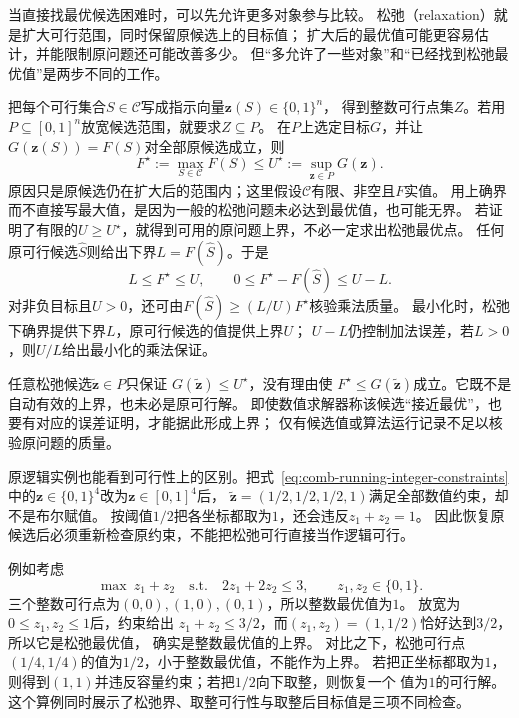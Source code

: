 当直接找最优候选困难时，可以先允许更多对象参与比较。
松弛（relaxation）就是扩大可行范围，同时保留原候选上的目标值；
扩大后的最优值可能更容易估计，并能限制原问题还可能改善多少。
但“多允许了一些对象”和“已经找到松弛最优值”是两步不同的工作。

把每个可行集合$S\in\mathcal C$写成指示向量$\bm z(S)\in\{0,1\}^n$，
得到整数可行点集$Z$。若用$P\subseteq[0,1]^n$放宽候选范围，就要求$Z\subseteq P$。
在$P$上选定目标$G$，并让$G(\bm z(S))=F(S)$对全部原候选成立，则
\begin{equation}
  F^\star:=\max_{S\in\mathcal C}F(S)
  \leq U^\star:=\sup_{\bm z\in P}G(\bm z).
  \label{eq:comb-relaxation-upper-bound}
\end{equation}
原因只是原候选仍在扩大后的范围内；这里假设$\mathcal C$有限、非空且$F$实值。
用上确界而不直接写最大值，是因为一般的松弛问题未必达到最优值，也可能无界。
若证明了有限的$U\geq U^\star$，就得到可用的原问题上界，不必一定求出松弛最优点。
任何原可行候选$\widehat S$则给出下界$L=F(\widehat S)$。于是
\begin{equation}
  L\leq F^\star\leq U,\qquad
  0\leq F^\star-F(\widehat S)\leq U-L.
  \label{eq:comb-relaxation-certificate}
\end{equation}
对非负目标且$U>0$，还可由$F(\widehat S)\geq(L/U)F^\star$核验乘法质量。
最小化时，松弛下确界提供下界$L$，原可行候选的值提供上界$U$；
$U-L$仍控制加法误差，若$L>0$，则$U/L$给出最小化的乘法保证。

任意松弛候选$\widetilde{\bm z}\in P$只保证
$G(\widetilde{\bm z})\leq U^\star$，没有理由使
$F^\star\leq G(\widetilde{\bm z})$成立。它既不是自动有效的上界，也未必是原可行解。
即使数值求解器称该候选“接近最优”，也要有对应的误差证明，才能据此形成上界；
仅有候选值或算法运行记录不足以核验原问题的质量。

原逻辑实例也能看到可行性上的区别。把式~\eqref{eq:comb-running-integer-constraints}
中的$\bm z\in\{0,1\}^4$改为$\bm z\in[0,1]^4$后，
$\widetilde{\bm z}=(1/2,1/2,1/2,1)$满足全部数值约束，却不是布尔赋值。
按阈值$1/2$把各坐标都取为$1$，还会违反$z_1+z_2=1$。
因此恢复原候选后必须重新检查原约束，不能把松弛可行直接当作逻辑可行。

例如考虑
\begin{equation}
  \max\ z_1+z_2
  \quad\text{s.t.}\quad
  2z_1+2z_2\leq3,\qquad z_1,z_2\in\{0,1\}.
  \label{eq:comb-two-item-relaxation}
\end{equation}
三个整数可行点为$(0,0),(1,0),(0,1)$，所以整数最优值为$1$。
放宽为$0\leq z_1,z_2\leq1$后，约束给出
$z_1+z_2\leq3/2$，而$(z_1,z_2)=(1,1/2)$恰好达到$3/2$，所以它是松弛最优值，
确实是整数最优值的上界。
对比之下，松弛可行点$(1/4,1/4)$的值为$1/2$，小于整数最优值，不能作为上界。
若把正坐标都取为$1$，则得到$(1,1)$并违反容量约束；若把$1/2$向下取整，则恢复一个
值为$1$的可行解。这个算例同时展示了松弛界、取整可行性与取整后目标值是三项不同检查。

